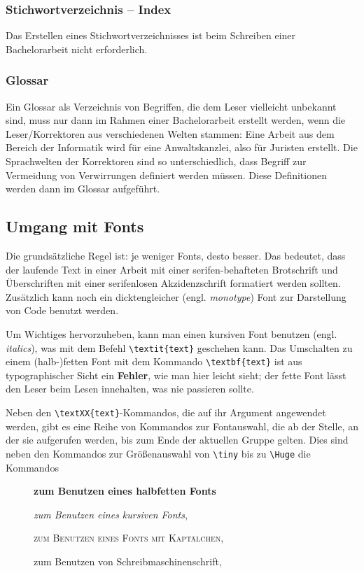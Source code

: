 \documentclass[ngerman,               %
               a4paper,               %
               fleqn,                 %
                     ]{scrartcl}       %
\begin{document}
\subsubsection{Stichwortverzeichnis -- Index}

Das Erstellen eines Stichwortverzeichnisses ist beim Schreiben einer
Bachelorarbeit nicht erforderlich.


\subsubsection{Glossar}

Ein Glossar als Verzeichnis von Begriffen, die dem Leser vielleicht
unbekannt sind, muss nur dann im Rahmen einer Bachelorarbeit erstellt
werden, wenn die Leser/Korrektoren aus verschiedenen Welten stammen:
Eine Arbeit aus dem Bereich der Informatik wird für eine Anwaltskanzlei,
also für Juristen erstellt. Die Sprachwelten der Korrektoren sind so
unterschiedlich, dass Begriff zur Vermeidung von Verwirrungen definiert
werden müssen. Diese Definitionen werden dann im Glossar aufgeführt.


\subsection{Umgang mit Fonts}

Die grundsätzliche Regel ist: je weniger Fonts, desto besser. Das bedeutet,
dass der laufende Text in einer Arbeit mit einer serifen-behafteten
Brotschrift und Überschriften mit einer serifenlosen Akzidenzschrift
formatiert werden sollten. Zusätzlich kann noch ein dicktengleicher
(engl. \textit{monotype}) Font zur Darstellung von Code benutzt werden.

Um Wichtiges hervorzuheben, kann man einen kursiven Font benutzen (engl.
\textit{italics}), was mit dem Befehl \lstinline|\textit{text}| geschehen
kann. Das Umschalten zu einem (halb-)fetten Font mit dem Kommando
\lstinline|\textbf{text}| ist aus typographischer Sicht ein
\textbf{Fehler}, wie man hier leicht sieht; der fette Font lässt den
Leser beim Lesen innehalten, was nie passieren sollte.

Neben den \lstinline|\textXX{text}|-Kommandos, die auf ihr Argument
angewendet werden, gibt es eine Reihe von Kommandos zur Fontauswahl,
die ab der Stelle, an der sie aufgerufen werden, bis zum Ende der
aktuellen Gruppe gelten. Dies sind neben den Kommandos zur Größenauswahl
von \lstinline|\tiny| bis zu \lstinline|\Huge| die Kommandos
\begin{description}
  \item[] {\bfseries zum Benutzen eines halbfetten Fonts}
  \item[] {\itshape zum Benutzen eines kursiven Fonts},
  \item[] {\scshape zum Benutzen eines Fonts mit Kaptälchen},
  \item[] {\ttfamily zum Benutzen von Schreibmaschinenschrift},
\end{description}
\end{document}

